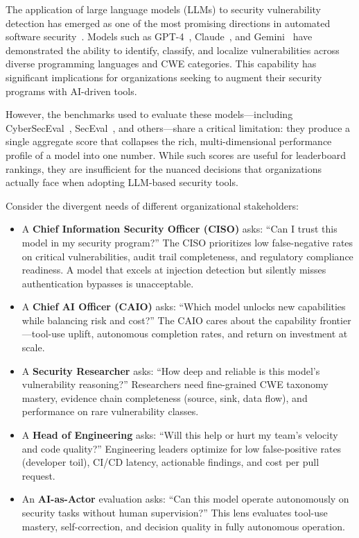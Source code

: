 \documentclass[10pt,twocolumn]{article}
\begin{document}
The application of large language models (LLMs) to security vulnerability detection has emerged as one of the most promising directions in automated software security~\citep{pearce2022asleep,tony2023llmseceval,fang2024llmagents}. Models such as GPT-4~\citep{achiam2023gpt4}, Claude~\citep{anthropic2024claude}, and Gemini~\citep{team2023gemini} have demonstrated the ability to identify, classify, and localize vulnerabilities across diverse programming languages and CWE categories. This capability has significant implications for organizations seeking to augment their security programs with AI-driven tools.

However, the benchmarks used to evaluate these models---including CyberSecEval~\citep{bhatt2023cyberseceval}, SecEval~\citep{li2023seceval}, and others---share a critical limitation: they produce a single aggregate score that collapses the rich, multi-dimensional performance profile of a model into one number. While such scores are useful for leaderboard rankings, they are insufficient for the nuanced decisions that organizations actually face when adopting LLM-based security tools.

Consider the divergent needs of different organizational stakeholders:

\begin{itemize}[noitemsep,topsep=2pt]
    \item A \textbf{Chief Information Security Officer (CISO)} asks: ``Can I trust this model in my security program?'' The CISO prioritizes low false-negative rates on critical vulnerabilities, audit trail completeness, and regulatory compliance readiness. A model that excels at injection detection but silently misses authentication bypasses is unacceptable.
    \item A \textbf{Chief AI Officer (CAIO)} asks: ``Which model unlocks new capabilities while balancing risk and cost?'' The CAIO cares about the capability frontier---tool-use uplift, autonomous completion rates, and return on investment at scale.
    \item A \textbf{Security Researcher} asks: ``How deep and reliable is this model's vulnerability reasoning?'' Researchers need fine-grained CWE taxonomy mastery, evidence chain completeness (source, sink, data flow), and performance on rare vulnerability classes.
    \item A \textbf{Head of Engineering} asks: ``Will this help or hurt my team's velocity and code quality?'' Engineering leaders optimize for low false-positive rates (developer toil), CI/CD latency, actionable findings, and cost per pull request.
    \item An \textbf{AI-as-Actor} evaluation asks: ``Can this model operate autonomously on security tasks without human supervision?'' This lens evaluates tool-use mastery, self-correction, and decision quality in fully autonomous operation.
\end{itemize}
\end{document}
